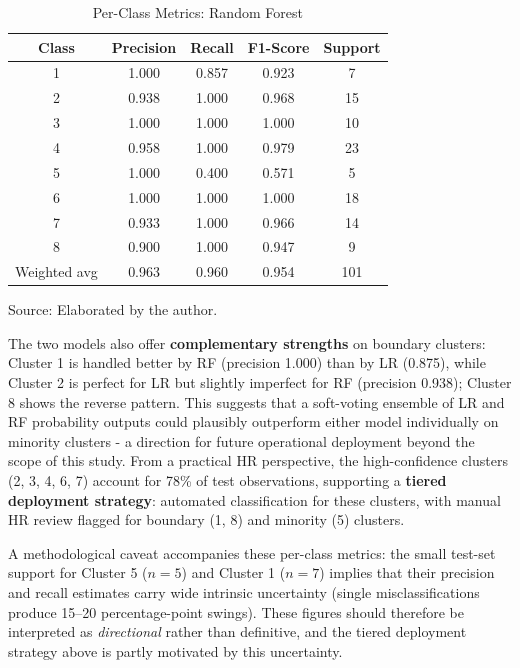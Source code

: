 \documentclass[alpha-refs,english]{RBCA_v3.0}
\begin{document}
\begin{table}[ht]
    \centering
    \begin{threeparttable}
    \caption{Per-Class Metrics: Random Forest}
    \label{tab:per_class_rf}
    \begin{tabular}{ccccc}
        \toprule
        Class & Precision & Recall & F1-Score & Support \\
        \midrule
        1            & 1.000 & 0.857 & 0.923 & 7 \\
        2            & 0.938 & 1.000 & 0.968 & 15 \\
        3            & 1.000 & 1.000 & 1.000 & 10 \\
        4            & 0.958 & 1.000 & 0.979 & 23 \\
        5            & 1.000 & 0.400 & 0.571 & 5 \\
        6            & 1.000 & 1.000 & 1.000 & 18 \\
        7            & 0.933 & 1.000 & 0.966 & 14 \\
        8            & 0.900 & 1.000 & 0.947 & 9 \\
        \midrule
        Weighted avg & 0.963 & 0.960 & 0.954 & 101 \\
        \bottomrule
    \end{tabular}
    \begin{tablenotes}
        \footnotesize
        \item Source: Elaborated by the author.
    \end{tablenotes}
    \end{threeparttable}
\end{table}

The two models also offer \textbf{complementary strengths} on boundary
clusters: Cluster 1 is handled better by RF (precision 1.000) than by LR
(0.875), while Cluster 2 is perfect for LR but slightly imperfect for RF
(precision 0.938); Cluster 8 shows the reverse pattern. This suggests that
a soft-voting ensemble of LR and RF probability outputs could plausibly
outperform either model individually on minority clusters - a direction
for future operational deployment beyond the scope of this study. From a
practical HR perspective, the high-confidence clusters (2, 3, 4, 6, 7)
account for 78\% of test observations, supporting a \textbf{tiered
deployment strategy}: automated classification for these clusters, with
manual HR review flagged for boundary (1, 8) and minority (5) clusters.

A methodological caveat accompanies these per-class metrics: the small
test-set support for Cluster 5 ($n=5$) and Cluster 1 ($n=7$) implies that
their precision and recall estimates carry wide intrinsic uncertainty
(single misclassifications produce 15--20 percentage-point swings). These
figures should therefore be interpreted as \textit{directional} rather
than definitive, and the tiered deployment strategy above is partly
motivated by this uncertainty.
\end{document}
